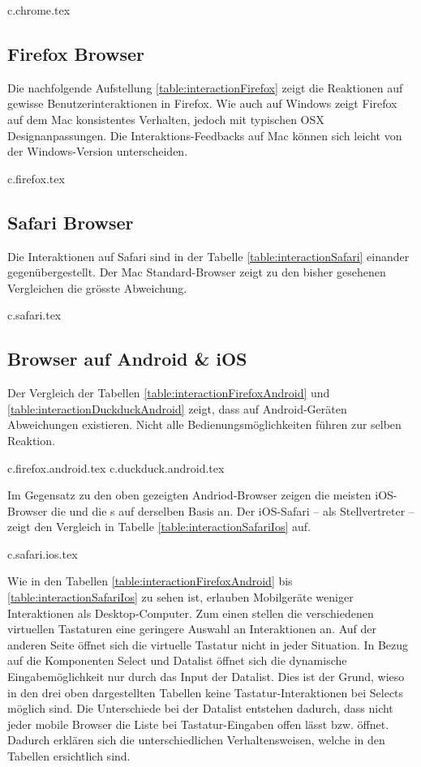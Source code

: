 {c.chrome.tex}


\clearpage
\subsection{Firefox Browser}
\label{sec:firefoxBrowser}

Die nachfolgende Aufstellung \ref{table:interactionFirefox} zeigt die Reaktionen auf gewisse Benutzerinteraktionen in Firefox. 
Wie auch auf Windows zeigt Firefox auf dem Mac konsistentes Verhalten, jedoch mit typischen OSX Designanpassungen. 
Die Interaktions-Feedbacks auf Mac können sich leicht von der Windows-Version unterscheiden. 

{c.firefox.tex}


\clearpage
\subsection{Safari Browser}
\label{sec:safariBrowser}

Die Interaktionen auf Safari sind in der Tabelle \ref{table:interactionSafari} einander gegenübergestellt. 
Der Mac Standard-Browser zeigt zu den bisher gesehenen Vergleichen die grösste Abweichung. 

{c.safari.tex}


\clearpage
\subsection{Browser auf Android \& iOS}
\label{sec:mobileBrowser}

Der Vergleich der Tabellen \ref{table:interactionFirefoxAndroid} und \ref{table:interactionDuckduckAndroid} zeigt, dass auf Android-Geräten Abweichungen existieren. 
Nicht alle Bedienungsmöglichkeiten führen zur selben Reaktion.

{c.firefox.android.tex}
{c.duckduck.android.tex}

\clearpage
Im Gegensatz zu den oben gezeigten Andriod-Browser zeigen die meisten iOS-Browser die  und die s auf derselben Basis an. 
Der iOS-Safari – als Stellvertreter – zeigt den Vergleich in Tabelle \ref{table:interactionSafariIos} auf. 

{c.safari.ios.tex}

Wie in den Tabellen \ref{table:interactionFirefoxAndroid} bis \ref{table:interactionSafariIos} zu sehen ist, erlauben Mobilgeräte weniger Interaktionen als Desktop-Computer. 
Zum einen stellen die verschiedenen virtuellen Tastaturen eine geringere Auswahl an Interaktionen an. 
Auf der anderen Seite öffnet sich die virtuelle Tastatur nicht in jeder Situation. 
In Bezug auf die Komponenten Select und Datalist öffnet sich die dynamische Eingabemöglichkeit nur durch das Input der Datalist. 
Dies ist der Grund, wieso in den drei oben dargestellten Tabellen keine Tastatur-Interaktionen bei Selects möglich sind. 
Die Unterschiede bei der Datalist entstehen dadurch, dass nicht jeder mobile Browser die Liste bei Tastatur-Eingaben offen lässt bzw. öffnet. 
Dadurch erklären sich die unterschiedlichen Verhaltensweisen, welche in den Tabellen ersichtlich sind. 

